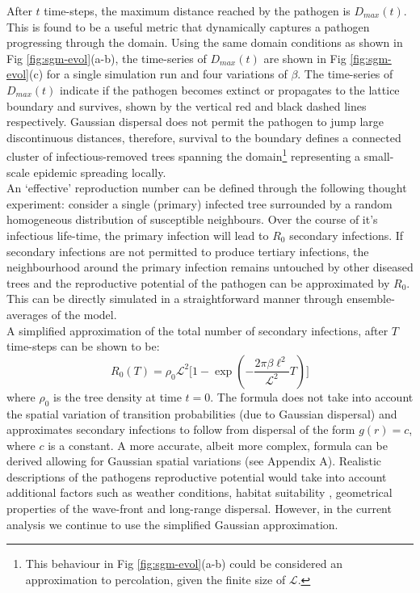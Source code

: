 After $t$ time-steps, the maximum distance reached by the pathogen is $D_{max}(t)$. This is found to be a useful metric that dynamically captures a pathogen progressing through the domain. Using the same domain conditions as shown in Fig \ref{fig:sgm-evol}(a-b), the time-series of $D_{max}(t)$ are shown in Fig \ref{fig:sgm-evol}(c) for a single simulation run and four variations of $\beta$. The time-series of $D_{max}(t)$ indicate if the pathogen becomes extinct or propagates to the lattice boundary and survives, shown by the vertical red and black dashed lines respectively. Gaussian dispersal does not permit the pathogen to jump large discontinuous distances, therefore, survival to the boundary defines a connected cluster of infectious-removed trees spanning the domain\footnote{This behaviour in Fig \ref{fig:sgm-evol}(a-b) could be considered an approximation to percolation, given the finite size of $\mathcal{L}$.} representing a small-scale epidemic spreading locally.\\

An `effective' reproduction number can be defined through the following thought experiment: consider a single (primary) infected tree surrounded by a random homogeneous distribution of susceptible neighbours. Over the course of it's infectious life-time, the primary infection will lead to $R_0$ secondary infections. If secondary infections are not permitted to produce tertiary infections, the neighbourhood around the primary infection remains untouched by other diseased trees and the reproductive potential of the pathogen can be approximated by $R_0$. This can be directly simulated in a straightforward manner through ensemble-averages of the model.\\

A simplified approximation of the total number of secondary infections, after $T$ time-steps can be shown to be:
\begin{equation}
    R_0(T) = \rho_0 \mathcal{L}^2 \Big[ 1 - \exp(-\frac{2\pi\beta\ell^2}{\mathcal{L}^2}T) \Big]
\label{eq:R0-final}
\end{equation}{} 
where $\rho_{0}$ is the tree density at time $t=0$. The formula does not take into account the spatial variation of transition probabilities (due to Gaussian dispersal) and approximates secondary infections to follow from dispersal of the form $g(r) = c$, where $c$ is a constant. A more accurate, albeit more complex, formula can be derived allowing for Gaussian spatial variations (see Appendix A). Realistic descriptions of the pathogens reproductive potential would take into account additional factors such as weather conditions, habitat suitability \cite{large-scale-model-SSTLM}, geometrical properties of the wave-front and long-range dispersal. However, in the current analysis we continue to use the simplified Gaussian approximation.\\

